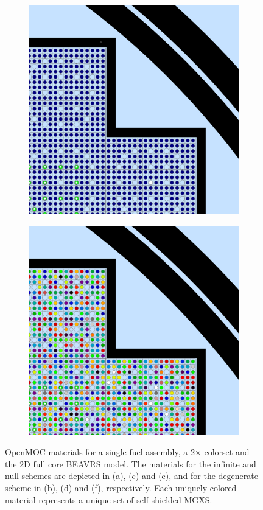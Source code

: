 \begin{figure}[h!]
\begin{subfigure}{.5\textwidth}
  \centering
  \includegraphics[width=0.8\linewidth]{figures/quantification/homogenization/full-core-null-materials}
  \caption{}
  \label{fig:chap8-full-core-null-materials}
\end{subfigure}%
\begin{subfigure}{.5\textwidth}
  \centering
  \includegraphics[width=0.8\linewidth]{figures/quantification/homogenization/full-core-degenerate-materials}
  \caption{}
  \label{fig:chap8-full-core-degenerate-materials}
\end{subfigure}
\caption[Depiction of infinite, null and degenerate spatial homogenization schemes]{OpenMOC materials for a single fuel assembly, a 2$\times$ colorset and the 2D full core \ac{BEAVRS} model. The materials for the infinite and null schemes are depicted in (a), (c) and (e), and for the degenerate scheme in (b), (d) and (f), respectively. Each uniquely colored material represents a unique set of self-shielded \ac{MGXS}.}
\label{fig:chap8-homogenization-schemes}
\end{figure}

